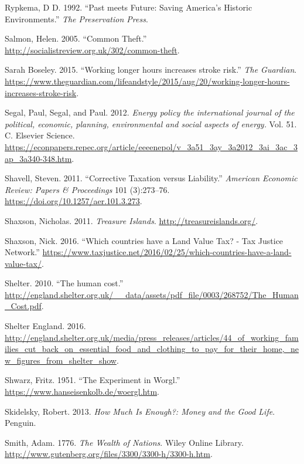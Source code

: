 \documentclass[]{tufte-handout}
\begin{document}
\leavevmode\hypertarget{ref-Rypkema1992a}{}%
Rypkema, D D. 1992. ``Past meets Future: Saving America's Historic
Environments.'' \emph{The Preservation Press}.

\leavevmode\hypertarget{ref-Salmon2005}{}%
Salmon, Helen. 2005. ``Common Theft.''
\url{http://socialistreview.org.uk/302/common-theft}.

\leavevmode\hypertarget{ref-SarahBoseley2015}{}%
Sarah Boseley. 2015. ``Working longer hours increases stroke risk.''
\emph{The Guardian}.
\url{https://www.theguardian.com/lifeandstyle/2015/aug/20/working-longer-hours-increases-stroke-risk}.

\leavevmode\hypertarget{ref-Segal2012}{}%
Segal, Paul, Segal, and Paul. 2012. \emph{Energy policy the
international journal of the political, economic, planning,
environmental and social aspects of energy.} Vol. 51. C. Elsevier
Science.
\url{https://econpapers.repec.org/article/eeeenepol/v_3a51_3ay_3a2012_3ai_3ac_3ap_3a340-348.htm}.

\leavevmode\hypertarget{ref-Shavell2011}{}%
Shavell, Steven. 2011. ``Corrective Taxation versus Liability.''
\emph{American Economic Review: Papers \& Proceedings} 101 (3):273--76.
\url{https://doi.org/10.1257/aer.101.3.273}.

\leavevmode\hypertarget{ref-Shaxson2011}{}%
Shaxson, Nicholas. 2011. \emph{Treasure Islands}.
\url{http://treasureislands.org/}.

\leavevmode\hypertarget{ref-Shaxson2016}{}%
Shaxson, Nick. 2016. ``Which countries have a Land Value Tax? - Tax
Justice Network.''
\url{https://www.taxjustice.net/2016/02/25/which-countries-have-a-land-value-tax/}.

\leavevmode\hypertarget{ref-Shelter2010}{}%
Shelter. 2010. ``The human cost.''
\url{http://england.shelter.org.uk/__data/assets/pdf_file/0003/268752/The_Human_Cost.pdf}.

\leavevmode\hypertarget{ref-ShelterEngland2016}{}%
Shelter England. 2016.
\url{http://england.shelter.org.uk/media/press_releases/articles/44_of_working_families_cut_back_on_essential_food_and_clothing_to_pay_for_their_home,_new_figures_from_shelter_show}.

\leavevmode\hypertarget{ref-Shwarz1951}{}%
Shwarz, Fritz. 1951. ``The Experiment in Worgl.''
\url{https://www.hanseisenkolb.de/woergl.htm}.

\leavevmode\hypertarget{ref-Skidelsky2013}{}%
Skidelsky, Robert. 2013. \emph{How Much Is Enough?: Money and the Good
Life}. Penguin.

\leavevmode\hypertarget{ref-smith1776wealth}{}%
Smith, Adam. 1776. \emph{The Wealth of Nations}. Wiley Online Library.
\url{http://www.gutenberg.org/files/3300/3300-h/3300-h.htm}.
\end{document}
